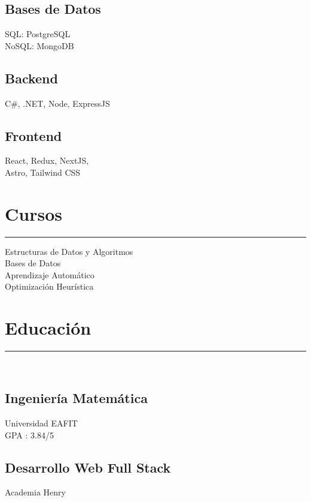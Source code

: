 \documentclass[]{rahulworld-resume}
\begin{document}
\begin{minipage}[t]{0.33\textwidth}
    \subsection{Bases de Datos}
    SQL: PostgreSQL\\
    NoSQL: MongoDB\\
    \vspace{1pt}
    \subsection{Backend}
    C\#, .NET, Node, ExpressJS\\
    \subsection{Frontend}
    React, Redux, NextJS, \\
    Astro, Tailwind CSS\\

    \sectionsep
    \section{Cursos}
    \noindent\rule{5cm}{0.4pt}

    Estructuras de Datos y Algoritmos\\
    Bases de Datos\\
    Aprendizaje Automático\\
    Optimización Heurística\\
    \sectionsep
    \section{Educación}
    \noindent\rule{3cm}{0.4pt}\\
    \subsection{Ingeniería Matemática} Universidad EAFIT \\
    GPA : 3.84/5\\

    \subsection{Desarrollo Web Full Stack}
    Academia Henry


\end{minipage}
\end{document}
